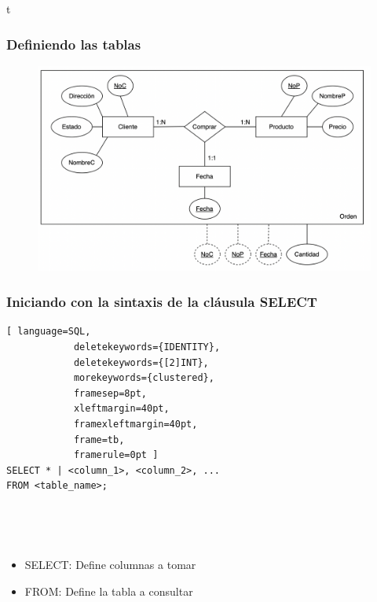 \documentclass[
	10pt, %
	aspectratio=169, %
]{beamer}
\begin{document}
\begin{frame}{t}
	
	\frametitle{Definiendo las tablas}
	
	\begin{figure}[h]
	\centering
		\includegraphics[scale=0.5]{bd.png}
	\end{figure}

	
\end{frame}


\begin{frame}[fragile]
	
	\frametitle{Iniciando con la sintaxis de la cláusula SELECT}
	
		\begin{lstlisting}[ language=SQL,
			deletekeywords={IDENTITY},
			deletekeywords={[2]INT},
			morekeywords={clustered},
			framesep=8pt,
			xleftmargin=40pt,
			framexleftmargin=40pt,
			frame=tb,
			framerule=0pt ]
SELECT * | <column_1>, <column_2>, ...
FROM <table_name>;
\end{lstlisting}

	\pause
	
	\ 
	
	\ 
	
	\begin{itemize}[label={}]
		\item SELECT: Define columnas a tomar
		\item FROM: Define la tabla a consultar
	\end{itemize}

\end{frame}

\end{document}
